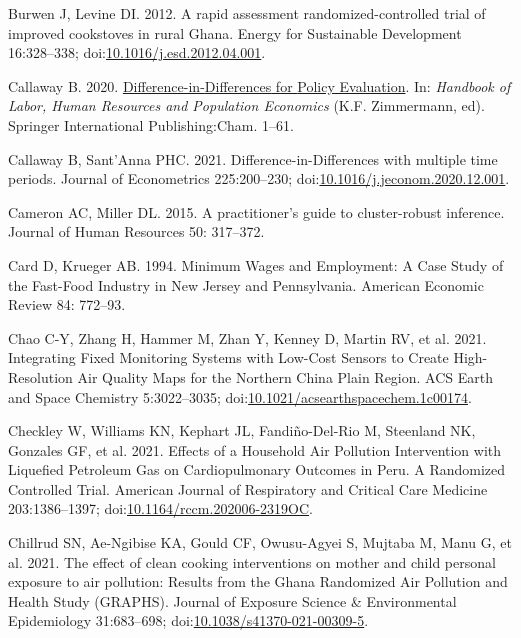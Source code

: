 \documentclass[
  letterpaper,
  DIV=11,
  numbers=noendperiod]{scrartcl}
\newlength{\cslhangindent}
\newenvironment{CSLReferences}[2] %
 {\begin{list}{}{%
  \setlength{\itemindent}{0pt}
  \setlength{\leftmargin}{0pt}
  \setlength{\parsep}{0pt}
  \ifodd #1
   \setlength{\leftmargin}{\cslhangindent}
   \setlength{\itemindent}{-1\cslhangindent}
  \fi
  \setlength{\itemsep}{#2\baselineskip}}}
 {\end{list}}
\begin{document}
\begin{CSLReferences}{1}{1}
Burwen J, Levine DI. 2012. A rapid assessment randomized-controlled
trial of improved cookstoves in rural {Ghana}. Energy for Sustainable
Development 16:328--338;
doi:\href{https://doi.org/10.1016/j.esd.2012.04.001}{10.1016/j.esd.2012.04.001}.

Callaway B. 2020.
\href{https://doi.org/10.1007/978-3-319-57365-6_352-1}{Difference-in-{Differences}
for {Policy Evaluation}}. In: \emph{Handbook of {Labor}, {Human
Resources} and {Population Economics}} (K.F. Zimmermann, ed). Springer
International Publishing:Cham. 1--61.

Callaway B, Sant'Anna PHC. 2021. Difference-in-{Differences} with
multiple time periods. Journal of Econometrics 225:200--230;
doi:\href{https://doi.org/10.1016/j.jeconom.2020.12.001}{10.1016/j.jeconom.2020.12.001}.

Cameron AC, Miller DL. 2015. A practitioner's guide to cluster-robust
inference. Journal of Human Resources 50: 317--372.

Card D, Krueger AB. 1994. Minimum {Wages} and {Employment}: {A Case
Study} of the {Fast-Food Industry} in {New Jersey} and {Pennsylvania}.
American Economic Review 84: 772--93.

Chao C-Y, Zhang H, Hammer M, Zhan Y, Kenney D, Martin RV, et al. 2021.
Integrating {Fixed Monitoring Systems} with {Low-Cost Sensors} to
{Create High-Resolution Air Quality Maps} for the {Northern China Plain
Region}. ACS Earth and Space Chemistry 5:3022--3035;
doi:\href{https://doi.org/10.1021/acsearthspacechem.1c00174}{10.1021/acsearthspacechem.1c00174}.

Checkley W, Williams KN, Kephart JL, Fandiño-Del-Rio M, Steenland NK,
Gonzales GF, et al. 2021. Effects of a {Household Air Pollution
Intervention} with {Liquefied Petroleum Gas} on {Cardiopulmonary
Outcomes} in {Peru}. {A Randomized Controlled Trial}. American Journal
of Respiratory and Critical Care Medicine 203:1386--1397;
doi:\href{https://doi.org/10.1164/rccm.202006-2319OC}{10.1164/rccm.202006-2319OC}.

Chillrud SN, Ae-Ngibise KA, Gould CF, Owusu-Agyei S, Mujtaba M, Manu G,
et al. 2021. The effect of clean cooking interventions on mother and
child personal exposure to air pollution: Results from the {Ghana
Randomized Air Pollution} and {Health Study} ({GRAPHS}). Journal of
Exposure Science \& Environmental Epidemiology 31:683--698;
doi:\href{https://doi.org/10.1038/s41370-021-00309-5}{10.1038/s41370-021-00309-5}.


\end{CSLReferences}
\end{document}
